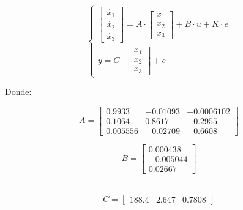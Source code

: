 \vspace{-0.5cm}
\begin{equation}
    \begin{cases}
        \begin{bmatrix}
            \dot{x_1}   \\
            \dot{x_2}   \\
            \dot{x_3}
        \end{bmatrix}
        =
        A
        \cdot
        \begin{bmatrix}
            x_1 \\
            x_2 \\
            x_3
        \end{bmatrix}
        +
        B
        \cdot
        u 
        +
        K
        \cdot
        e
        \\
        y =
        C
        \cdot
        \begin{bmatrix}
            x_1 \\
            x_2 \\
            x_3
        \end{bmatrix}
        +
        e

    \end{cases}
\end{equation}

Donde:

\vspace{-0.5cm}
\begin{equation}
    A = \begin{bmatrix}
        0.9933   &   -0.01093    &   -0.0006102\\
        0.1064   &   0.8617      &   -0.2955   \\
        0.005556 &   -0.02709    &   -0.6608            
    \end{bmatrix}
\end{equation}

\vspace{-0.5cm}
\begin{equation}
    B = \begin{bmatrix}
        0.000438   \\
        -0.005044  \\
        0.02667
    \end{bmatrix}
\end{equation}\

\vspace{-0.5cm}
\begin{equation}
    C = \begin{bmatrix}
        188.4 & 2.647 & 0.7808
    \end{bmatrix}
\end{equation}

